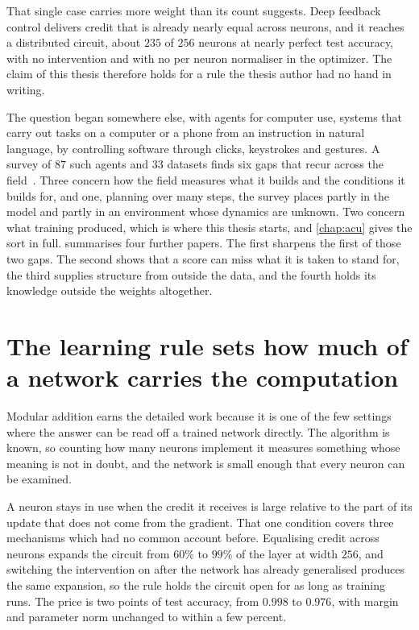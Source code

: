 That single case carries more weight than its count suggests. Deep feedback control
delivers credit that is already nearly equal across neurons, and it reaches a
distributed circuit, about $235$ of $256$ neurons at nearly perfect test
accuracy, with no intervention and with no per neuron normaliser in the
optimizer. The claim of this thesis therefore holds for a rule the thesis
author had no hand in writing.

The question began somewhere else, with agents for computer use, systems
that carry out tasks on a computer or a phone from an instruction
in natural language, by controlling software through clicks, keystrokes and
gestures. A survey of $87$ such agents and $33$ datasets finds six gaps that
recur across the field~\cite{sager_survey_2026}. Three concern how the field
measures what it builds and the conditions it builds for, and one, planning
over many steps, the survey places partly in the model and partly in an
environment whose dynamics are unknown. Two concern what training produced,
which is where this thesis starts, and \cref{chap:acu} gives the sort in
full.  summarises four further papers. The first sharpens
the first of those two gaps. The second shows that a score can miss what it is
taken to stand for, the third supplies structure from outside the data, and
the fourth holds its knowledge outside the weights altogether.


\section{The learning rule sets how much of a network carries the computation}
\label{sec:intro_rule}

Modular addition earns the detailed work because it is one of the few settings
where the answer can be read off a trained network directly. The algorithm is
known, so counting how many neurons implement it measures something whose
meaning is not in doubt, and the network is small enough that every neuron can
be examined.

A neuron stays in use when the credit it receives is large relative to the
part of its update that does not come from the gradient. That one condition
covers three mechanisms which had no common account before. Equalising credit
across neurons expands the circuit from $60\%$ to $99\%$ of the layer at width
$256$, and switching the intervention on after the network has already
generalised produces the same expansion, so the rule holds the circuit open
for as long as training runs. The price is two points of test accuracy, from
$0.998$ to $0.976$, with margin and parameter norm unchanged to within a few
percent.

